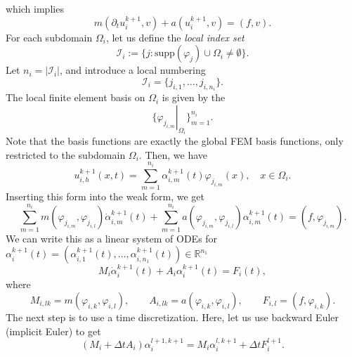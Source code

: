 \documentclass[a4paper, 11pt]{article}
\theoremstyle{plain}
\theoremstyle{definition}
\theoremstyle{remark}
\begin{document}
which implies
\begin{equation*}
    m(\partial_{t} u_{i}^{k+1}, v) + a(u_{i}^{k+1}, v) = (f, v).
\end{equation*}
For each subdomain $\Omega_{i}$, let us define the \textit{local index set}
\begin{equation*}
    \mathcal{I}_{i} := \{j: \text{supp}(\varphi_{j})\cup \Omega_{i} \neq \emptyset\}.
\end{equation*}
Let $n_{i} = \lvert \mathcal{I}_{i}\rvert$, and introduce a local numbering
\begin{equation*}
    \mathcal{I}_{i} = \{j_{i, 1}, \ldots, j_{i, n_{i}}\}.
\end{equation*}
The local finite element basis on $\Omega_{i}$ is given by the 
\begin{equation*}
    \{\left.\varphi_{j_{i, m}}\right|_{\Omega_{i}}\}^{n_{i}}_{m=1}.
\end{equation*}
Note that the basis functions are exactly the global FEM basis functions, only restricted to the subdomain $\Omega_{i}$. Then, we have
\begin{equation*}
    u^{k+1}_{i, h}(x, t) = \sum_{m = 1}^{n_i}\alpha^{k+1}_{i, m}(t)\varphi_{j_{i, m}}(x), \quad x\in \Omega_{i}.
\end{equation*}
Inserting this form into the weak form, we get
\begin{equation*}
    \sum_{m = 1}^{n_i}m(\varphi_{j_{i, m}}, \varphi_{j_{i, l}})\dot{\alpha}^{k+1}_{i, m}(t) + \sum_{m = 1}^{n_i}a(\varphi_{j_{i, m}}, \varphi_{j_{i, l}})\alpha^{k+1}_{i, m}(t) = (f, \varphi_{j_{i, m}}).
\end{equation*}
We can write this as a linear system of ODEs for $\alpha_{i}^{k+1}(t) = (\alpha^{k+1}_{i, 1}(t), \ldots, \alpha^{k+1}_{i, n_{1}}(t))\in \mathbb{R}^{n_{1}}$
\begin{equation*}
    M_{i}\dot{\alpha}_{i}^{k+1}(t) + A_{i}\alpha_{i}^{k+1}(t) = F_{i}(t),
\end{equation*}
where
\begin{equation*}
    M_{i, lk} = m(\varphi_{i, k}, \varphi_{i, l}), \qquad A_{i, lk} = a(\varphi_{i, k}, \varphi_{i, l}), \qquad F_{i, l} = (f, \varphi_{i, k}).
\end{equation*}
The next step is to use a time discretization. Here, let us use backward Euler (implicit Euler) to get
\begin{equation*}
    \left(M_{i} + \Delta t A_{i}\right)\alpha_{i}^{l+1, k+1} = M_{i} \alpha_{i}^{l, k+1} + \Delta tF_{i}^{l+1}.
\end{equation*}
\end{document}

